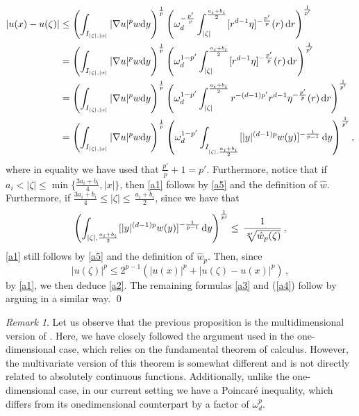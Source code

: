 \documentclass[11pt,leqno]{amsart}
\theoremstyle{remark}
\newtheorem{oss}[teo]{Remark}
\theoremstyle{definition}
\theoremstyle{definition}
\newcommand{\wstar}{{\hat w}}
\def\de{{\rm d}}
\begin{document}
\begin{align}
\nonumber
|u(x)-u(\zeta)|&\leq \left(\displaystyle\int_{I_{\vert \zeta\vert,\vert x\vert}}\vert \nabla u\vert^{p}w\de y\right)^{\frac{1}{p}}\left(\omega_{d}^{-\frac{p'}{p}}\int_{\vert \zeta\vert}^{{{a_i+b_i}\over{2}}}[r^{d-1}\eta]^{-\frac{p'}{p}}(r)\,\de r\right)^{1\over p'}\\
&=\left(\displaystyle\int_{I_{\vert \zeta\vert,\vert x\vert}}\vert \nabla u\vert^{p}w\de y\right)^{\frac{1}{p}}\left(\omega_{d}^{1-p'}\int_{\vert \zeta\vert}^{{{a_i+b_i}\over{2}}}[r^{d-1}\eta]^{-\frac{p'}{p}}(r)\,\de r\right)^{1\over p'}\label{a5}\\
&=\left(\displaystyle\int_{I_{\vert \zeta\vert,\vert x\vert}}\vert \nabla u\vert^{p}w\de y\right)^{\frac{1}{p}}\left(\omega_{d}^{1-p'}\int_{\vert \zeta\vert}^{{{a_i+b_i}\over{2}}}r^{-(d-1)p'}r^{d-1}\eta^{-\frac{p'}{p}}(r)\,\de r\right)^{1\over p'}\nonumber\\
&=\left(\displaystyle\int_{I_{\vert \zeta\vert,\vert x\vert}}\vert \nabla u\vert^{p}w\de y\right)^{\frac{1}{p}}\left(\omega_{d}^{1-p'}\int_{I_{\vert \zeta\vert,{{a_i+b_i}\over{2}}}}[\vert y\vert^{(d-1)p} w(y)]^{-\frac{1}{p-1}}\,\de y\right)^{1\over p'}\nonumber,
\end{align}
where in equality we have used that $\frac{p'}{p}+1=p'$. Furthermore, notice that if $a_i<\vert\zeta\vert\le\min\{\frac{3a_i+b_i}4,\vert x\vert\}$, then \eqref{a1} follows by \eqref{a5} and the definition of $\wstar$. Furthermore, if $\frac{3a_i+b_i}4\le \vert \zeta\vert\le\,\frac{a_i+b_i}2$, since we have that
\[
\left(\int_{\vert\zeta\vert,{{a_i+b_i}\over{2}}}[\vert y\vert^{(d-1)p} w(y)]^{-\frac{1}{p-1}}\,\de y\right)^{1\over p\prime}\le\,\frac{1}{\sqrt[p\prime]{\wstar_{p}(\zeta)}}\,,
\]
\eqref{a1} still follows by \eqref{a5} and the definition of $\wstar_{p}$.
Then, since
\begin{equation*}
|u(\zeta)|^{p}\leq2^{p-1}\left(|u(x)|^{p}+|u(\zeta)-u(x)|^{p}\right)\,,
\end{equation*}
by \eqref{a1}, we then deduce \eqref{a2}. The remaining formulas \eqref{a3} and (\ref{a4}) follow  by arguing in a similar way.
\qed
\begin{oss}
Let us observe that the previous proposition is the multidimensional version of \cite[Proposition 2.8]{CCMH1}. Here, we have closely followed the argument used in the one-dimensional case, which relies on the fundamental theorem of calculus. However, the multivariate version of this theorem is somewhat different and is not directly related to absolutely continuous functions. Additionally, unlike the one-dimensional case, in our current setting we have a Poincaré inequality, which differs from its onedimensional counterpart by a factor of  $\omega_{d}^{p}$.
\end{oss}
\end{document}
